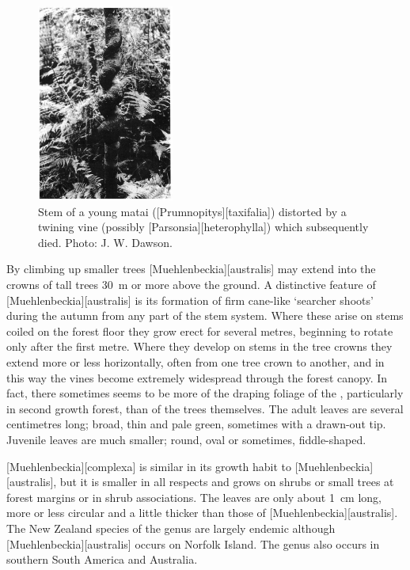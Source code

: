 \begin{figure}
	\includegraphics[width=0.4\textwidth]{graphics/figure35matai.jpg}
	\centering
	\caption[Stem of a young matai]{Stem of a young matai ([Prumnopitys][taxifalia]) distorted by a twining vine (possibly [Parsonsia][heterophylla]) which subsequently died.
	Photo: J. W. Dawson.}%
	\label{fig:35matai}
\end{figure}

By climbing up smaller trees [Muehlenbeckia][australis] may extend into the crowns of tall trees \SI{30}{\metre} or more above the ground.
A distinctive feature of [Muehlenbeckia][australis] is its formation of firm cane-like `searcher shoots' during the autumn from any part of the stem system.
Where these arise on stems coiled on the forest floor they grow erect for several metres, beginning to rotate only after the first metre.
Where they develop on stems in the tree crowns they extend more or less horizontally, often from one tree crown to another, and in this way the vines become extremely widespread through the forest canopy.
In fact, there sometimes seems to be more of the draping foliage of the , particularly in second growth forest, than of the trees themselves.
The adult leaves are several centimetres long; broad, thin and pale green, sometimes with a drawn-out tip.
Juvenile leaves are much smaller; round, oval or sometimes, fiddle-shaped.

[Muehlenbeckia][complexa] is similar in its growth habit to [Muehlenbeckia][australis], but it is smaller in all respects and grows on shrubs or small trees at forest margins or in shrub associations.
The leaves are only about \SI{1}{\centi\metre} long, more or less circular and a little thicker than those of [Muehlenbeckia][australis].
The New Zealand species of the genus are largely endemic although [Muehlenbeckia][australis] occurs on Norfolk Island.
The genus also occurs in southern South America and Australia.

